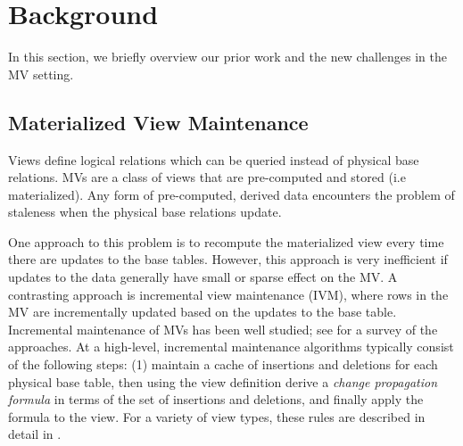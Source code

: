 \section{Background}\label{sec-background}
In this section, we briefly overview our prior work and the new challenges in the MV setting.


\iffalse
\subsection{Materialized View Maintenance}\label{subsec-inc}
Views define logical relations which can be queried instead of physical base relations.
MVs are a class of views that are pre-computed and stored (i.e materialized).
Any form of pre-computed, derived data encounters the problem of staleness when the physical base relations update.

One approach to this problem is to recompute the materialized view every time there are updates to the base tables.
However, this approach is very inefficient if updates to the data generally have small or sparse effect on the MV. 
A contrasting approach is incremental view maintenance (IVM), where rows in the MV are incrementally updated based on the updates to the base table.
Incremental maintenance of MVs has been well studied; see \cite{chirkova2011materialized} for a survey of the approaches. 
At a high-level, incremental maintenance algorithms typically consist of the following steps: (1) maintain a cache of insertions and deletions for each physical base table, then using the view definition derive a \emph{change propagation formula} in terms of the set of insertions and deletions, and finally apply the formula to the view.
For a variety of view types, these rules are described in detail in \cite{DBLP:journals/vldb/KochAKNNLS14, DBLP:conf/pods/Koch10}.


